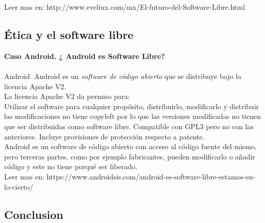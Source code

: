 \documentclass{book}
\begin{document}
Leer mas en: http://www.eveliux.com/mx/El-futuro-del-Software-Libre.html

\subsection{Ética y el software libre}

{\bf Caso Android. ¿ Android es Software Libre?}
\\
\\
Android. Android es un \emph{software de código abierto} que se distribuye bajo la licencia Apache V2.
\\
La licencia Apache V2 da permiso para:
\\
Utilizar el software para cualquier propósito, distribuirlo, modificarlo y distribuir las modificaciones
no tiene copyleft por lo que las versiones modificadas no tienen que ser distribuidas como software libre.
Compatible con GPL3 pero no con las anteriores.
Incluye provisiones de protección respecto a patente.
\\
Android es un software de código abierto con  acceso al código fuente del mismo, pero terceras partes, como por ejemplo fabricantes, pueden modificarlo o añadir código y este no tiene porqué ser liberado. 
\\
Leer mas en: https://www.androidsis.com/android-es-software-libre-estamos-en-lo-cierto/

\subsection{Conclusion}
	
\end{document}
